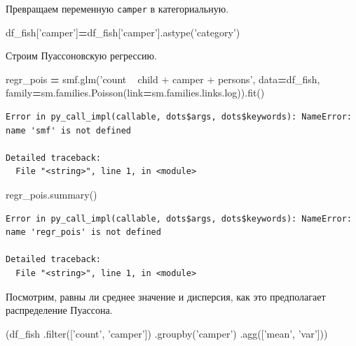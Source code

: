 \documentclass[]{book}
\newenvironment{Shaded}{\begin{snugshade}}{\end{snugshade}}
\newcommand{\BuiltInTok}[1]{#1}
\newcommand{\NormalTok}[1]{#1}
\newcommand{\OperatorTok}[1]{\textcolor[rgb]{0.81,0.36,0.00}{\textbf{#1}}}
\newcommand{\StringTok}[1]{\textcolor[rgb]{0.31,0.60,0.02}{#1}}
\begin{document}
Превращаем переменную \texttt{camper} в категориальную.

\begin{Shaded}
\begin{Highlighting}[]
\NormalTok{df_fish[}\StringTok{'camper'}\NormalTok{]}\OperatorTok{=}\NormalTok{df_fish[}\StringTok{'camper'}\NormalTok{].astype(}\StringTok{'category'}\NormalTok{)}
\end{Highlighting}
\end{Shaded}

Строим Пуассоновскую регрессию.

\begin{Shaded}
\begin{Highlighting}[]
\NormalTok{regr_pois }\OperatorTok{=}\NormalTok{ smf.glm(}\StringTok{'count ~ child + camper +  persons'}\NormalTok{, data}\OperatorTok{=}\NormalTok{df_fish,}
\NormalTok{                    family}\OperatorTok{=}\NormalTok{sm.families.Poisson(link}\OperatorTok{=}\NormalTok{sm.families.links.log)).fit()}
\end{Highlighting}
\end{Shaded}

\begin{verbatim}
Error in py_call_impl(callable, dots$args, dots$keywords): NameError: name 'smf' is not defined

Detailed traceback: 
  File "<string>", line 1, in <module>
\end{verbatim}

\begin{Shaded}
\begin{Highlighting}[]
\NormalTok{regr_pois.summary()}
\end{Highlighting}
\end{Shaded}

\begin{verbatim}
Error in py_call_impl(callable, dots$args, dots$keywords): NameError: name 'regr_pois' is not defined

Detailed traceback: 
  File "<string>", line 1, in <module>
\end{verbatim}

Посмотрим, равны ли среднее значение и дисперсия, как это предполагает распределение Пуассона.

\begin{Shaded}
\begin{Highlighting}[]
\NormalTok{(df_fish}
\NormalTok{ .}\BuiltInTok{filter}\NormalTok{([}\StringTok{'count'}\NormalTok{, }\StringTok{'camper'}\NormalTok{])}
\NormalTok{ .groupby(}\StringTok{'camper'}\NormalTok{)}
\NormalTok{ .agg([}\StringTok{'mean'}\NormalTok{, }\StringTok{'var'}\NormalTok{]))}
\end{Highlighting}
\end{Shaded}
\end{document}
